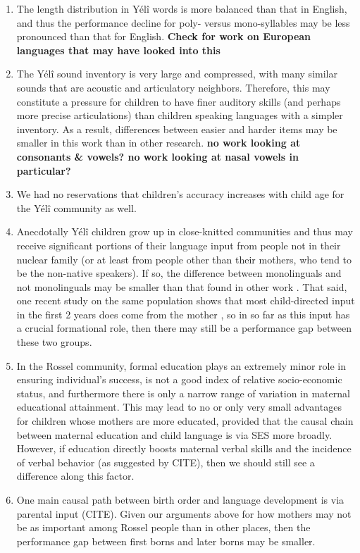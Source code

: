 \documentclass[english,,man,floatsintext]{apa6}
\providecommand{\tightlist}{%
  \setlength{\itemsep}{0pt}\setlength{\parskip}{0pt}}
\begin{document}
\begin{enumerate}
\def\labelenumi{\arabic{enumi}.}
\tightlist
\item
  The length distribution in Yélî words is more balanced than that in English, and thus the performance decline for poly- versus mono-syllables may be less pronounced than that for English. \textbf{Check for work on European languages that may have looked into this}
\item
  The Yélî sound inventory is very large and compressed, with many similar sounds that are acoustic and articulatory neighbors. Therefore, this may constitute a pressure for children to have finer auditory skills (and perhaps more precise articulations) than children speaking languages with a simpler inventory. As a result, differences between easier and harder items may be smaller in this work than in other research. \textbf{no work looking at consonants \& vowels? no work looking at nasal vowels in particular?}
\item
  We had no reservations that children's accuracy increases with child age for the Yélî community as well.
\item
  Anecdotally Yélî children grow up in close-knitted communities and thus may receive significant portions of their language input from people not in their nuclear family
  (or at least from people other than their mothers, who tend to be the non-native speakers). If so, the difference between monolinguals and not monolinguals may be smaller than that found in other work
  . That said, one recent study on the same population shows that most child-directed input in the first 2 years does come from the mother
  , so in so far as this input has a crucial formational role, then there may still be a performance gap between these two groups.
\item
  In the Rossel community, formal education plays an extremely minor role in ensuring individual's success, is not a good index of relative socio-economic status, and furthermore there is only a narrow range of variation in maternal educational attainment. This may lead to no or only very small advantages for children whose mothers are more educated, provided that the causal chain between maternal education and child language is via SES more broadly. However, if education directly boosts maternal verbal skills and the incidence of verbal behavior (as suggested by CITE), then we should still see a difference along this factor.
\item
  One main causal path between birth order and language development is via parental input (CITE). Given our arguments above for how mothers may not be as important among Rossel people than in other places, then the performance gap between first borns and later borns may be smaller.
\end{enumerate}
\end{document}
